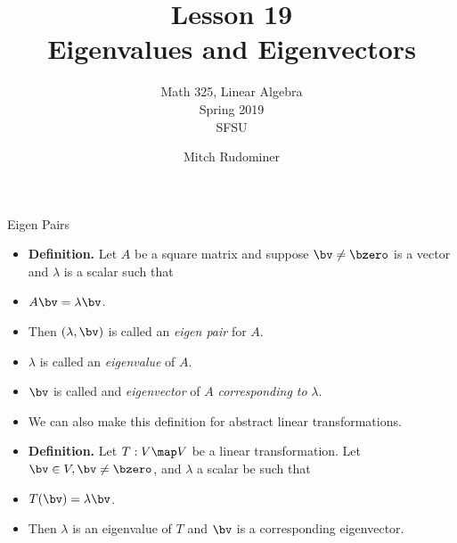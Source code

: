\documentclass{beamer}
\title{Lesson 19 \\ Eigenvalues and Eigenvectors}
\subtitle{Math 325, Linear Algebra \\ Spring 2019 \\ SFSU}
\author{Mitch Rudominer}
\date{}
\begin{document}
\begin{frame}
  \titlepage
\end{frame}


\begin{frame}{Eigen Pairs}

\begin{itemize}
\item \textbf{Definition.} Let $A$ be a square matrix and suppose $\bv\not=\bzero$ is a vector and $\lambda$ is a scalar such that
\item $A\bv=\lambda\bv$.
\item Then $\left(\lambda, \bv \right)$ is called an \emph{eigen pair} for $A$.
\item $\lambda$ is called an \emph{eigenvalue} of $A$.
\item $\bv$ is called and \emph{eigenvector} of $A$ \emph{corresponding to} $\lambda$.
\item We can also make this definition for abstract linear transformations.
\item \textbf{Definition.} Let $T:V\map V$ be a linear transformation. Let $\bv\in V, \bv\not=\bzero$, and $\lambda$ a scalar be such that
\item $T(\bv)=\lambda\bv$.
\item Then $\lambda$ is an eigenvalue of $T$  and $\bv$ is a corresponding eigenvector.
\end{itemize}
\end{frame}

\end{document}
